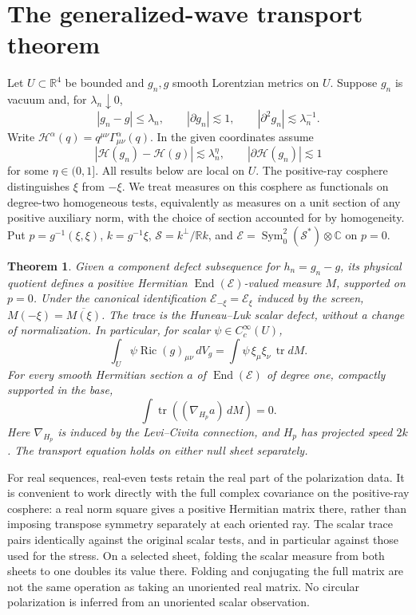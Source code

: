 \documentclass[11pt]{article}
\newtheorem{theorem}{Theorem}
\begin{document}
\section{The generalized-wave transport theorem}\label{sec:gauge}
Let \(U\subset\mathbb R^4\) be bounded and \(g_n,g\) smooth Lorentzian metrics on \(U\). Suppose \(g_n\) is vacuum and, for \(\lambda_n\downarrow0\),
\[
 |g_n-g|\le \lambda_n,\qquad |\partial g_n|\lesssim1,\qquad
 |\partial^2 g_n|\lesssim\lambda_n^{-1}.
\]
Write \(\mathcal H^\alpha(q)=q^{\mu\nu}\Gamma^\alpha_{\mu\nu}(q)\). In the given coordinates assume
\[
 |\mathcal H(g_n)-\mathcal H(g)|\lesssim \lambda_n^\eta,\qquad
 |\partial\mathcal H(g_n)|\lesssim1
\]
for some \(\eta\in(0,1]\). All results below are local on \(U\). The positive-ray cosphere distinguishes \(\xi\) from \(-\xi\). We treat measures on this cosphere as functionals on degree-two homogeneous tests, equivalently as measures on a unit section of any positive auxiliary norm, with the choice of section accounted for by homogeneity. Put \(p=g^{-1}(\xi,\xi)\), \(k=g^{-1}\xi\), \(\mathscr S=k^\perp/\mathbb Rk\), and \(\mathcal E=\operatorname{Sym}^2_0(\mathscr S^*)\otimes\mathbb C\) on \(p=0\).

\begin{theorem}
Given a component defect subsequence for \(h_n=g_n-g\), its physical quotient defines a positive Hermitian \(\operatorname{End}(\mathcal E)\)-valued measure \(M\), supported on \(p=0\). Under the canonical identification \(\mathcal E_{-\xi}=\mathcal E_\xi\) induced by the screen, \(M(-\xi)=\overline{M(\xi)}\). The trace is the Huneau--Luk scalar defect, without a change of normalization. In particular, for scalar \(\psi\in C_c^\infty(U)\),
\[
 \int_U \psi\operatorname{Ric}(g)_{\mu\nu}\,dV_g
 =\int\psi\,\xi_\mu\xi_\nu\,\operatorname{tr}dM.
\]
For every smooth Hermitian section \(a\) of \(\operatorname{End}(\mathcal E)\) of degree one, compactly supported in the base,
\[
 \int \operatorname{tr}\left((\nabla_{H_p}a)\,dM\right)=0.
\]
Here \(\nabla_{H_p}\) is induced by the Levi--Civita connection, and \(H_p\) has projected speed \(2k\). The transport equation holds on either null sheet separately.
\end{theorem}

For real sequences, real-even tests retain the real part of the polarization data. It is convenient to work directly with the full complex covariance on the positive-ray cosphere: a real norm square gives a positive Hermitian matrix there, rather than imposing transpose symmetry separately at each oriented ray. The scalar trace pairs identically against the original scalar tests, and in particular against those used for the stress. On a selected sheet, folding the scalar measure from both sheets to one doubles its value there. Folding and conjugating the full matrix are not the same operation as taking an unoriented real matrix. No circular polarization is inferred from an unoriented scalar observation.
\end{document}
